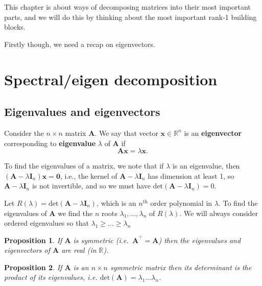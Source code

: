 \documentclass[]{book}
\newtheorem{proposition}{Proposition}[chapter]
\theoremstyle{definition}
\theoremstyle{definition}
\theoremstyle{definition}
\theoremstyle{remark}
\begin{document}
This chapter is about ways of decomposing matrices into their most important parts, and we will do this by thinking about the most important rank-1 building blocks.

Firstly though, we need a recap on eigenvectors.

\hypertarget{spectraleigen-decomposition}{%
\section{Spectral/eigen decomposition}\label{spectraleigen-decomposition}}

\hypertarget{eigenvalues-and-eigenvectors}{%
\subsection{Eigenvalues and eigenvectors}\label{eigenvalues-and-eigenvectors}}

Consider the \(n\times n\) matrix \(\mathbf A\).
We say that
vector \(\mathbf x\in \mathbb{R}^n\) is an \textbf{eigenvector} corresponding to \textbf{eigenvalue} \(\lambda\) of \(\mathbf A\) if
\[\mathbf A\mathbf x= \lambda \mathbf x.\]

To find the eigenvalues of a matrix, we note that if \(\lambda\) is an eigenvalue, then \((\mathbf A-\lambda \mathbf I_n)\mathbf x=\boldsymbol 0\), i.e., the kernel of \(\mathbf A-\lambda \mathbf I_n\) has dimension at least 1, so \(\mathbf A-\lambda \mathbf I_n\) is not invertible, and so we must have \(\text{det}(\mathbf A-\lambda \mathbf I_n)=0\).

Let \(R(\lambda )=\text{det}(\mathbf A-\lambda \mathbf I_n)\), which is an \(n^{\text{th}}\) order polynomial in \(\lambda\). To find the eigenvalues of \(\mathbf A\) we find the \(n\) roots \(\lambda _1, \dots , \lambda _n\) of \(R(\lambda )\). We will always consider ordered eigenvalues so that \(\lambda _1\geq \dots \geq \lambda _n\)

\begin{proposition}
\protect\hypertarget{prp:unnamed-chunk-2}{}{\label{prp:unnamed-chunk-2} }If \(\mathbf A\) is symmetric (i.e.~\(\mathbf A^\top =\mathbf A\)) then the
eigenvalues and eigenvectors of \(\mathbf A\) are \emph{real} (in \(\mathbb{R}\)).
\end{proposition}

\begin{proposition}
\protect\hypertarget{prp:deteig}{}{\label{prp:deteig} }If \(\mathbf A\) is an \(n \times n\) symmetric matrix
then its determinant is the product of its eigenvalues, i.e. \(\text{det}(\mathbf A)=\lambda _1 \dots \lambda _n\).
\end{proposition}
\end{document}

